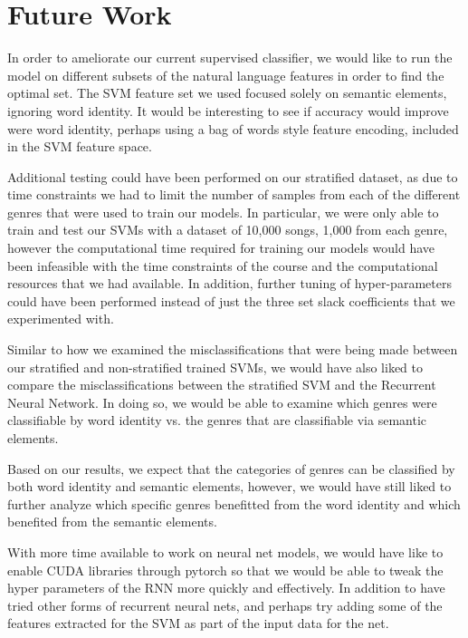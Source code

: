 \documentclass[journal]{IEEEtran}
\begin{document}
\section{Future Work}

In order to ameliorate our current supervised classifier, we would like to run the model on different subsets of the natural language features in order to find the optimal set. The SVM feature set we used focused solely on semantic elements, ignoring word identity. It would be interesting to see if accuracy would improve were word identity, perhaps using a bag of words style feature encoding, included in the SVM feature space.

Additional testing could have been performed on our stratified dataset, as due to time constraints we had to limit the number of samples from each of the different genres that were used to train our models. In particular, we were only able to train and test our SVMs with a dataset of 10,000 songs, 1,000 from each genre, however the computational time required for training our models would have been infeasible with the time constraints of the course and the computational resources that we had available. In addition, further tuning of hyper-parameters could have been performed instead of just the three set slack coefficients that we experimented with.

Similar to how we examined the misclassifications that were being made between our stratified and non-stratified trained SVMs, we would have also liked to compare the misclassifications between the stratified SVM and the Recurrent Neural Network. In doing so, we would be able to examine which genres were classifiable by word identity vs. the genres that are classifiable via semantic elements.

Based on our results, we expect that the categories of genres can be classified by both word identity and semantic elements, however, we would have still liked to further analyze which specific genres benefitted from the word identity and which benefited from the semantic elements.

With more time available to work on neural net models, we would have like to enable CUDA libraries through pytorch so that we would be able to tweak the hyper parameters of the RNN more quickly and effectively. In addition to have tried other forms of recurrent neural nets, and perhaps try adding some of the features extracted for the SVM as part of the input data for the net. 
\end{document}
